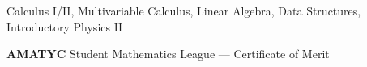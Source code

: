 \documentclass[./Resume.tex]{subfiles}
\begin{document}
	\vspace*{-2mm}
		   \begin{center}
			   Calculus I/II, Multivariable Calculus, Linear Algebra, Data Structures, Introductory Physics II
		   \end{center}
	{\bfseries AMATYC} Student Mathematics League --- Certificate of Merit
	\vspace*{-2mm}
\end{document}
